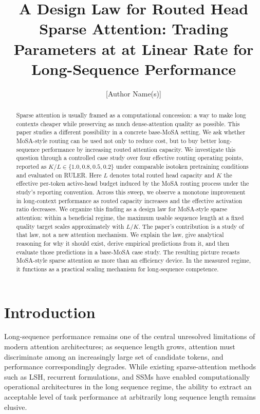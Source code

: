 \documentclass[11pt]{article}
\title{A Design Law for Routed Head Sparse Attention: Trading Parameters at at Linear Rate for Long-Sequence Performance}
\author{[Author Name(s)]}
\date{}
\begin{document}
\maketitle

\begin{abstract}

Sparse attention is usually framed as a computational concession: a way to make long contexts cheaper while preserving as much dense-attention quality as possible. This paper studies a different possibility in a concrete base-MoSA setting. We ask whether MoSA-style routing can be used not only to reduce cost, but to buy better long-sequence performance by increasing routed attention capacity. We investigate this question through a controlled case study over four effective routing operating points, reported as $K/L \in \{1.0, 0.8, 0.5, 0.2\}$ under comparable isotoken pretraining conditions and evaluated on RULER. Here $L$ denotes total routed head capacity and $K$ the effective per-token active-head budget induced by the MoSA routing process under the study's reporting convention. Across this sweep, we observe a monotone improvement in long-context performance as routed capacity increases and the effective activation ratio decreases. We organize this finding as a design law for MoSA-style sparse attention: within a beneficial regime, the maximum usable sequence length at a fixed quality target scales approximately with $L/K$. The paper's contribution is a study of that law, not a new attention mechanism. We explain the law, give analytical reasoning for why it should exist, derive empirical predictions from it, and then evaluate those predictions in a base-MoSA case study. The resulting picture recasts MoSA-style sparse attention as more than an efficiency device. In the measured regime, it functions as a practical scaling mechanism for long-sequence competence.
\end{abstract}

\section{Introduction}

Long-sequence performance remains one of the central unresolved limitations of modern attention architectures; as sequence length grows, attention must discriminate among an increasingly large set of candidate tokens, and performance correspondingly degrades. While existing sparse-attention methods such as LSH, recurrent formulations, and SSMs have enabled computationally operational architectures in the long sequence regime, the ability to extract an acceptable level of task performance at arbitrarily long sequence length remains elusive. \citep{kitaev2020reformer, katharopoulos2020transformers, gu2022efficiently}
\end{document}
